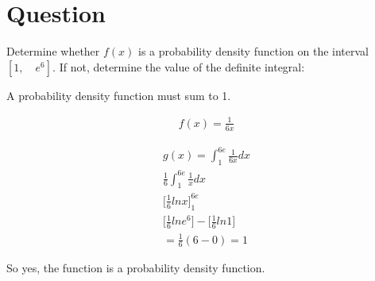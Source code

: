 \documentclass[12pt]{article}
\begin{document}
\section{Question}


Determine whether $f(x)$ is a probability density function on the interval
$[1, \quad e^6]$. If not, determine the value of the definite integral:

A probability density function must sum to 1.

\begin{align*}
f(x)=\frac{1}{6x}
\end{align*}


\setcounter{equation}{0}
\begin{align}
  g(x)= \int_{1}^{6e}\frac{1}{6x} dx
  \\
  \frac{1}{6} \int_{1}^{6e}\frac{1}{x} dx
  \\
  \bigg[ \frac{1}{6} lnx \bigg]_1 ^{6e}
  \\
  \bigg[\frac{1}{6} lne^6 \bigg] - \bigg[\frac{1}{6} ln1\bigg]
  \\
  =\frac{1}{6}(6-0)=1
\end{align}

So yes, the function is a probability density function.
\end{document}
